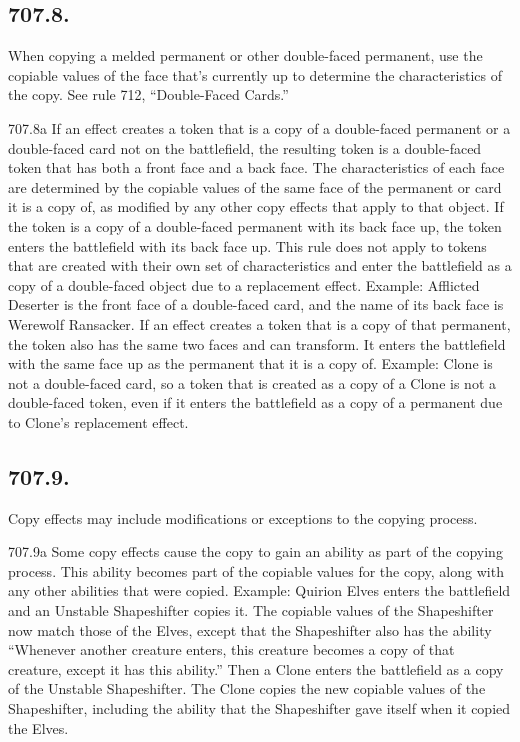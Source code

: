 \subsection*{707.8.}
When copying a melded permanent or other double-faced permanent, use the copiable values of the face that’s currently up to determine the characteristics of the copy. See rule 712, “Double-Faced Cards.”

707.8a If an effect creates a token that is a copy of a double-faced permanent or a double-faced card not on the battlefield, the resulting token is a double-faced token that has both a front face and a back face. The characteristics of each face are determined by the copiable values of the same face of the permanent or card it is a copy of, as modified by any other copy effects that apply to that object. If the token is a copy of a double-faced permanent with its back face up, the token enters the battlefield with its back face up. This rule does not apply to tokens that are created with their own set of characteristics and enter the battlefield as a copy of a double-faced object due to a replacement effect.
Example: Afflicted Deserter is the front face of a double-faced card, and the name of its back face is Werewolf Ransacker. If an effect creates a token that is a copy of that permanent, the token also has the same two faces and can transform. It enters the battlefield with the same face up as the permanent that it is a copy of.
Example: Clone is not a double-faced card, so a token that is created as a copy of a Clone is not a double-faced token, even if it enters the battlefield as a copy of a permanent due to Clone’s replacement effect.

\subsection*{707.9.}
Copy effects may include modifications or exceptions to the copying process.

707.9a Some copy effects cause the copy to gain an ability as part of the copying process. This ability becomes part of the copiable values for the copy, along with any other abilities that were copied.
Example: Quirion Elves enters the battlefield and an Unstable Shapeshifter copies it. The copiable values of the Shapeshifter now match those of the Elves, except that the Shapeshifter also has the ability “Whenever another creature enters, this creature becomes a copy of that creature, except it has this ability.” Then a Clone enters the battlefield as a copy of the Unstable Shapeshifter. The Clone copies the new copiable values of the Shapeshifter, including the ability that the Shapeshifter gave itself when it copied the Elves.

